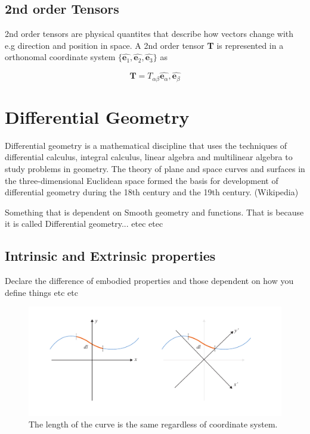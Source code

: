 \subsection{2nd order Tensors}
2nd order tensors are physical quantites that describe how vectors change with e.g direction and position in space. A 2nd order tensor \textbf{T} is represented in a orthonomal coordinate system $\{\hat{\textbf{e}_1},\hat{\textbf{e}_2} , \hat{\textbf{e}_3}\}$ as

\begin{equation}
\textbf{T} = T_{\alpha\beta}\hat{\textbf{e}_\alpha},\hat{\textbf{e}_\beta}
\end{equation}


\section{Differential Geometry}

Differential geometry is a mathematical discipline that uses the techniques of differential calculus, integral calculus, linear algebra and multilinear algebra to study problems in geometry. The theory of plane and space curves and surfaces in the three-dimensional Euclidean space formed the basis for development of differential geometry during the 18th century and the 19th century. (Wikipedia)

Something that is dependent on Smooth geometry and functions. That is because it is called Differential geometry... etec etec 


\newcommand{\upperRomannumeral}[1]{\uppercase\expandafter{\romannumeral#1}}
\newcommand{\lowerromannumeral}[1]{\romannumeral#1\relax}


\subsection{Intrinsic and Extrinsic properties}

Declare the difference of embodied properties and those dependent on how you define things etc etc

\begin{figure}[H]
\centering
\includegraphics[width=0.9\linewidth ]{figure/Theory/intrisic_extrinsic2.pdf}
\caption{The length of the curve is the same regardless of coordinate system.}
\end{figure}


